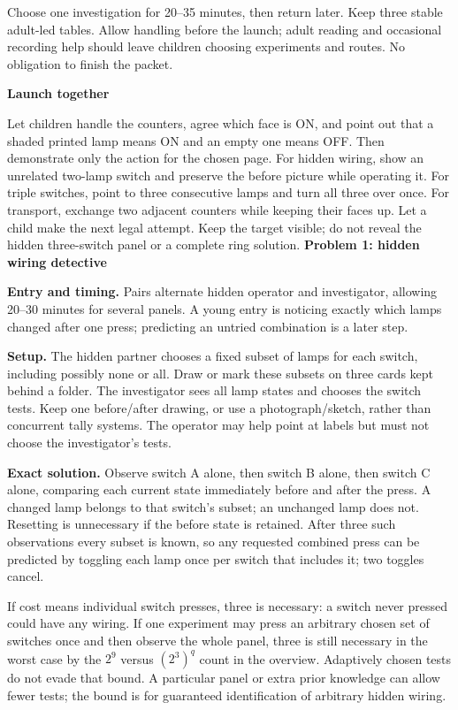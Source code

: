 \documentclass[11pt]{article}
\newcommand\lead[1]{\textbf{#1}\par}
\begin{document}
Choose one investigation for 20--35 minutes, then return later. Keep three stable adult-led tables. Allow handling before the launch; adult reading and occasional recording help should leave children choosing experiments and routes. No obligation to finish the packet.

\lead{Launch together}
Let children handle the counters, agree which face is ON, and point out that a shaded printed lamp means ON and an empty one means OFF. Then demonstrate only the action for the chosen page. For hidden wiring, show an unrelated two-lamp switch and preserve the before picture while operating it. For triple switches, point to three consecutive lamps and turn all three over once. For transport, exchange two adjacent counters while keeping their faces up. Let a child make the next legal attempt. Keep the target visible; do not reveal the hidden three-switch panel or a complete ring solution.
\newpage
\lead{Problem 1: hidden wiring detective}
\textbf{Entry and timing.} Pairs alternate hidden operator and investigator, allowing 20--30 minutes for several panels. A young entry is noticing exactly which lamps changed after one press; predicting an untried combination is a later step.

\textbf{Setup.} The hidden partner chooses a fixed subset of lamps for each switch, including possibly none or all. Draw or mark these subsets on three cards kept behind a folder. The investigator sees all lamp states and chooses the switch tests. Keep one before/after drawing, or use a photograph/sketch, rather than concurrent tally systems. The operator may help point at labels but must not choose the investigator's tests.

\textbf{Exact solution.} Observe switch A alone, then switch B alone, then switch C alone, comparing each current state immediately before and after the press. A changed lamp belongs to that switch's subset; an unchanged lamp does not. Resetting is unnecessary if the before state is retained. After three such observations every subset is known, so any requested combined press can be predicted by toggling each lamp once per switch that includes it; two toggles cancel.

If cost means individual switch presses, three is necessary: a switch never pressed could have any wiring. If one experiment may press an arbitrary chosen set of switches once and then observe the whole panel, three is still necessary in the worst case by the $2^9$ versus $(2^3)^q$ count in the overview. Adaptively chosen tests do not evade that bound. A particular panel or extra prior knowledge can allow fewer tests; the bound is for guaranteed identification of arbitrary hidden wiring.
\end{document}
